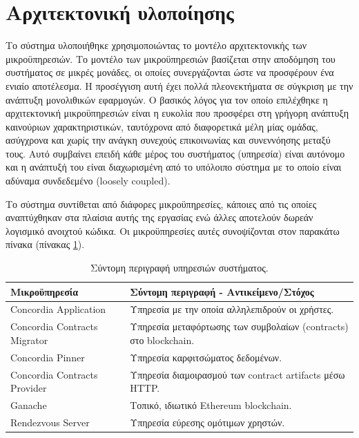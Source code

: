 \section{Αρχιτεκτονική υλοποίησης} \label{section:4-3-implementation-architecture}

Το σύστημα υλοποιήθηκε χρησιμοποιώντας το μοντέλο αρχιτεκτονικής των μικροϋπηρεσιών. Το μοντέλο των μικροϋπηρεσιών βασίζεται στην αποδόμηση του συστήματος σε μικρές μονάδες, οι οποίες συνεργάζονται ώστε να προσφέρουν ένα ενιαίο αποτέλεσμα. Η προσέγγιση αυτή έχει πολλά πλεονεκτήματα σε σύγκριση με την ανάπτυξη μονολιθικών εφαρμογών. %
Ο βασικός λόγος για τον οποίο επιλέχθηκε η αρχιτεκτονική μικροϋπηρεσιών είναι η ευκολία που προσφέρει στη γρήγορη ανάπτυξη καινούριων χαρακτηριστικών, ταυτόχρονα από διαφορετικά μέλη μίας ομάδας, ασύγχρονα και χωρίς την ανάγκη συνεχούς επικοινωνίας και συνεννόησης μεταξύ τους. Αυτό συμβαίνει επειδή κάθε μέρος του συστήματος (υπηρεσία) είναι αυτόνομο και η ανάπτυξή του είναι διαχωρισμένη από το υπόλοιπο σύστημα με το οποίο είναι αδύναμα συνδεδεμένο (loosely coupled).

Το σύστημα συντίθεται από διάφορες μικροϋπηρεσίες, κάποιες από τις οποίες αναπτύχθηκαν στα πλαίσια αυτής της εργασίας ενώ άλλες αποτελούν δωρεάν λογισμικό ανοιχτού κώδικα. Οι μικροϋπηρεσίες αυτές συνοψίζονται στον παρακάτω πίνακα (πίνακας \ref{table:4-3-microservice-summary}).

\begin{table}[H]
    \begin{center}
        \begin{tabularx}{\textwidth}{l X}
            \toprule
            \textbf{Μικροϋπηρεσία} & \textbf{Σύντομη περιγραφή - Αντικείμενο/Στόχος} \\
            \midrule
            Concordia Application        & Υπηρεσία με την οποία αλληλεπιδρούν οι χρήστες. \\ [0.5ex]
            Concordia Contracts Migrator & Υπηρεσία μεταφόρτωσης των συμβολαίων (contracts) στο blockchain. \\ [0.5ex]
            Concordia Pinner             & Υπηρεσία καρφιτσώματος δεδομένων. \\ [0.5ex]
            Concordia Contracts Provider & Υπηρεσία διαμοιρασμού των contract artifacts μέσω HTTP. \\ [0.5ex]
            Ganache                      & Τοπικό, ιδιωτικό Ethereum blockchain. \\ [0.5ex]
            Rendezvous Server            & Υπηρεσία εύρεσης ομότιμων χρηστών. \\ [0.5ex]
            \bottomrule
        \end{tabularx}
    \end{center}
    \caption{Σύντομη περιγραφή υπηρεσιών συστήματος.}
    \label{table:4-3-microservice-summary}
\end{table}

